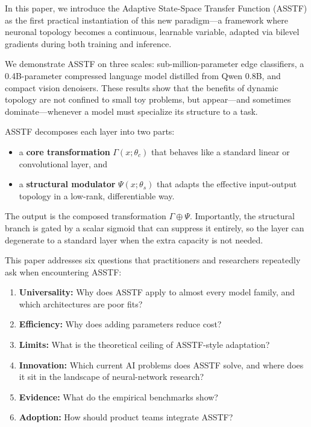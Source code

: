 \documentclass[11pt,a4paper]{article}
\theoremstyle{definition}
\begin{document}
In this paper, we introduce the Adaptive State-Space Transfer Function (ASSTF) as the first practical instantiation of this new paradigm---a framework where neuronal topology becomes a continuous, learnable variable, adapted via bilevel gradients during both training and inference.

We demonstrate ASSTF on three scales: sub-million-parameter edge classifiers, a 0.4B-parameter compressed language model distilled from Qwen 0.8B, and compact vision denoisers. These results show that the benefits of dynamic topology are not confined to small toy problems, but appear---and sometimes dominate---whenever a model must specialize its structure to a task.

ASSTF decomposes each layer into two parts:
\begin{itemize}
    \item a \textbf{core transformation} $\Gamma(x;\theta_c)$ that behaves like a standard linear or convolutional layer, and
    \item a \textbf{structural modulator} $\Psi(x;\theta_s)$ that adapts the effective input-output topology in a low-rank, differentiable way.
\end{itemize}
The output is the composed transformation $\Gamma \oplus \Psi$. Importantly, the structural branch is gated by a scalar sigmoid that can suppress it entirely, so the layer can degenerate to a standard layer when the extra capacity is not needed.

This paper addresses six questions that practitioners and researchers repeatedly ask when encountering ASSTF:
\begin{enumerate}
    \item \textbf{Universality:} Why does ASSTF apply to almost every model family, and which architectures are poor fits?
    \item \textbf{Efficiency:} Why does adding parameters reduce cost?
    \item \textbf{Limits:} What is the theoretical ceiling of ASSTF-style adaptation?
    \item \textbf{Innovation:} Which current AI problems does ASSTF solve, and where does it sit in the landscape of neural-network research?
    \item \textbf{Evidence:} What do the empirical benchmarks show?
    \item \textbf{Adoption:} How should product teams integrate ASSTF?
\end{enumerate}

\end{document}
